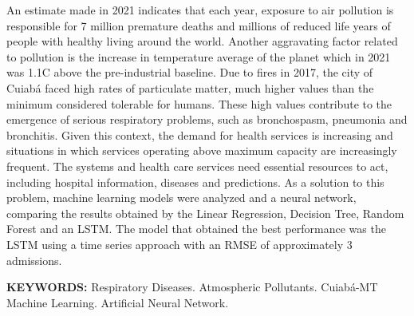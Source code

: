 \documentclass[
  12pt,		%
  a4paper,	%
  openright,%
  oneside,	%
  chapter=TITLE,		%
  section=TITLE,		%
  english,	%
  french,	%
  spanish,	%
  brazil	%
]{abntex2}
\begin{document}
    \begin{resumo}[Abstract] %
    
    An estimate made in 2021 indicates that each year, exposure to air pollution is
    responsible for 7 million premature deaths and millions of reduced life years of people with
    healthy living around the world. Another aggravating factor related to pollution is the increase in temperature
    average of the planet which in 2021 was 1.1\degree C above the pre-industrial baseline. Due to fires in
    2017, the city of Cuiabá faced high rates of particulate matter, much higher values
    than the minimum considered tolerable for humans. These high values contribute to
    the emergence of serious respiratory problems, such as bronchospasm, pneumonia and bronchitis.
    Given this context, the demand for health services is increasing and situations in which
    services operating above maximum capacity are increasingly frequent. The systems and health care services 
    need essential resources to act, including hospital information, diseases and
    predictions. As a solution to this problem, machine learning models were analyzed and
    a neural network, comparing the results obtained by the Linear Regression, Decision Tree, Random Forest
    and an LSTM. The model that obtained the best performance was the LSTM using a
    time series approach with an RMSE of approximately 3 admissions.
        
        \vspace*{0.5cm}
        
        \noindent\textbf{\MakeUppercase{Keywords: }} Respiratory Diseases. Atmospheric Pollutants. Cuiabá-MT
        Machine Learning. Artificial Neural Network.
    
    \end{resumo}
    
    
    \listoffigures*
    \newpage
    
\end{document}

